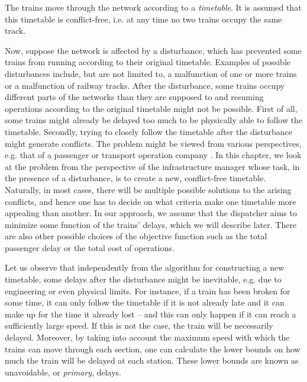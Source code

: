 The trains move through the network according to a \emph{timetable}. It is
assumed that this timetable is conflict-free, i.e. at any time no two trains
occupy the same track.

Now, suppose the network is affected by a disturbance, which has prevented some
trains from running according to their original timetable. Examples of possible
disturbances include, but are not limited to, a malfunction of one or more
trains or a malfunction of railway tracks. After the disturbance, some trains
occupy different parts of the networks than they are supposed to and resuming
operations according to the original timetable might not be possible. First of
all, some trains might already be delayed too much to be physically able to
follow the timetable. Secondly, trying to closely follow the timetable after
the disturbance might generate conflicts. The problem might be viewed from
various perspectives, e.g. that of a passenger or transport operation company
\cite{tornquist,lamorgese,Jensen2016}. In this chapter, we look at the problem
from the perspective of the infrastructure manager whose task, in the presence
of a disturbance, is to create a new, conflict-free timetable. Naturally, in
most cases, there will be multiple possible solutions to the arising conflicts,
and hence one has to decide on what criteria make one timetable more appealing
than another. In our approach, we assume that the dispatcher aims to minimize
some function of the trains' delays, which we will describe later. There are
also other possible choices of the objective function \cite{8795577} such as
the total passenger delay or the total cost of operations.

Let us observe that independently from the algorithm for constructing a new
timetable, some delays after the disturbance might be inevitable, e.g. due to
engineering or even physical limits. For instance, if a train has been broken
for some time, it can only follow the timetable if it is not already late and
it can make up for the time it already lost -- and this can only happen if it
can reach a sufficiently large speed. If this is not the case, the train will
be necessarily delayed. Moreover, by taking into account the maximum speed with
which the trains can move through each section, one can calculate the lower
bounds on how much the train will be delayed at each station. These lower
bounds are known as unavoidable, or \emph{primary}, delays.

